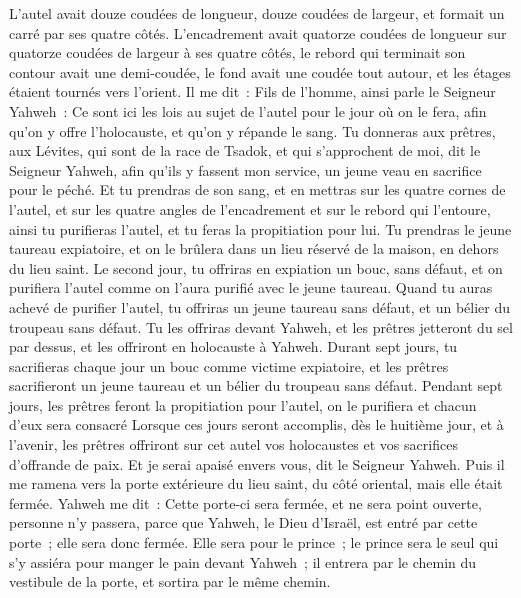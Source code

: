 \begin{multicols}{2}
L'autel avait douze coudées de longueur, douze coudées de largeur, et formait un carré par ses quatre côtés.
L'encadrement avait quatorze coudées de longueur sur quatorze coudées de largeur à ses quatre côtés, le rebord qui terminait son contour avait une demi-coudée, le fond avait une coudée tout autour, et les étages étaient tournés vers l'orient.
Il me dit~: Fils de l'homme, ainsi parle le Seigneur Yahweh~: Ce sont ici les lois au sujet de l'autel pour le jour où on le fera, afin qu'on y offre l'holocauste, et qu'on y répande le sang.
Tu donneras aux prêtres, aux Lévites, qui sont de la race de Tsadok, et qui s'approchent de moi, dit le Seigneur Yahweh, afin qu'ils y fassent mon service, un jeune veau en sacrifice pour le péché.
Et tu prendras de son sang, et en mettras sur les quatre cornes de l'autel, et sur les quatre angles de l'encadrement et sur le rebord qui l'entoure, ainsi tu purifieras l'autel, et tu feras la propitiation pour lui.
Tu prendras le jeune taureau expiatoire, et on le brûlera dans un lieu réservé de la maison, en dehors du lieu saint.
Le second jour, tu offriras en expiation un bouc, sans défaut, et on purifiera l'autel comme on l'aura purifié avec le jeune taureau.
Quand tu auras achevé de purifier l'autel, tu offriras un jeune taureau sans défaut, et un bélier du troupeau sans défaut.
Tu les offriras devant Yahweh, et les prêtres jetteront du sel par dessus, et les offriront en holocauste à Yahweh.
Durant sept jours, tu sacrifieras chaque jour un bouc comme victime expiatoire, et les prêtres sacrifieront un jeune taureau et un bélier du troupeau sans défaut.
Pendant sept jours, les prêtres feront la propitiation pour l'autel, on le purifiera et chacun d'eux sera consacré
Lorsque ces jours seront accomplis, dès le huitième jour, et à l'avenir, les prêtres offriront sur cet autel vos holocaustes et vos sacrifices d'offrande de paix. Et je serai apaisé envers vous, dit le Seigneur Yahweh.
\VerseOne{}Puis il me ramena vers la porte extérieure du lieu saint, du côté oriental, mais elle était fermée.
Yahweh me dit~: Cette porte-ci sera fermée, et ne sera point ouverte, personne n'y passera, parce que Yahweh, le Dieu d'Israël, est entré par cette porte~; elle sera donc fermée.
Elle sera pour le prince~; le prince sera le seul qui s'y assiéra pour manger le pain devant Yahweh~; il entrera par le chemin du vestibule de la porte, et sortira par le même chemin.

\end{multicols}
